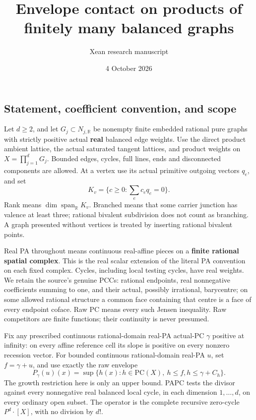 \documentclass[
  11pt,
]{article}
\title{Envelope contact on products of finitely many balanced graphs}
\author{Xean research manuscript}
\date{4 October 2026}
\begin{document}
\maketitle

\subsection{Statement, coefficient convention, and
scope}\label{statement-coefficient-convention-and-scope}

Let \(d\geq2\), and let \(G_j\subset N_{j,\mathbb{R}}\) be nonempty
finite embedded rational pure graphs with strictly positive actual
\textbf{real} balanced edge weights. Use the direct product ambient
lattice, the actual saturated tangent lattices, and product weights on
\(X=\prod_{j=1}^dG_j\). Bounded edges, cycles, full lines, ends and
disconnected components are allowed. At a vertex use its actual
primitive outgoing vectors \(q_e\), and set \[
 K_v=\{c\geq0:\sum_e c_eq_e=0\}.
\] Rank means \(\dim\operatorname{span}_{\mathbb{R}}K_v\). Branched
means that some carrier junction has valence at least three; rational
bivalent subdivision does not count as branching. A graph presented
without vertices is treated by inserting rational bivalent points.

Real PA throughout means continuous real-affine pieces on a
\textbf{finite rational spatial complex}. This is the real scalar
extension of the literal PA convention on each fixed complex. Cycles,
including local testing cycles, have real weights. We retain the
source's genuine PCCs: rational endpoints, real nonnegative coefficients
summing to one, and their actual, possibly irrational, barycentre; on
some allowed rational structure a common face containing that centre is
a face of every endpoint coface. Raw PC means every such Jensen
inequality. Raw competitors are finite functions; their continuity is
never presumed.

Fix any prescribed continuous rational-domain real-PA actual-PC
\(\gamma\) positive at infinity: on every affine reference cell its
slope is positive on every nonzero recession vector. For bounded
continuous rational-domain real-PA \(u\), set \(f=\gamma+u\), and use
exactly the raw envelope \[
 P_\gamma(u)(x)=\sup\{h(x):h\in\mathrm{PC}(X),\ h\leq f,
                                      h\leq\gamma+C_h\}.
 \tag{E}
\] The growth restriction here is only an upper bound. PAPC tests the
divisor against every nonnegative real balanced local cycle, in each
dimension \(1,\ldots,d\), on every ordinary open subset. The operator is
the complete recursive zero-cycle \(P^d\cdot[X]\), with no division by
\(d!\).
\end{document}

